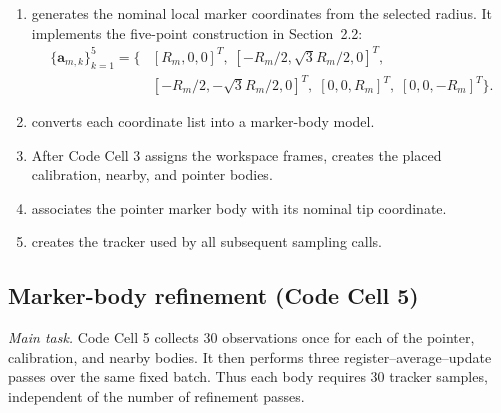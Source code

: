 \documentclass[11pt]{article}
\newcommand{\vct}[1]{\bm{#1}}
\begin{document}
\begin{enumerate}
\renewcommand{\labelenumi}{\roman{enumi}.}
\item {} generates the nominal local marker coordinates from the selected radius.  It implements the five-point construction in Section~2.2:
\[
\begin{aligned}
\{\vct{a}_{m,k}\}_{k=1}^{5}=\{&
[R_m,0,0]^T,\;
[-R_m/2,\sqrt{3}R_m/2,0]^T,\\
&[-R_m/2,-\sqrt{3}R_m/2,0]^T,\;
[0,0,R_m]^T,\;
[0,0,-R_m]^T\}.
\end{aligned}
\]
\item {} converts each coordinate list into a marker-body model.
\item After Code Cell 3 assigns the workspace frames,  creates the placed calibration, nearby, and pointer bodies.
\item {} associates the pointer marker body with its nominal tip coordinate.
\item {} creates the tracker used by all subsequent sampling calls.
\end{enumerate}

\subsection{Marker-body refinement (Code Cell 5)}
\noindent\textit{Main task.} Code Cell 5 collects 30 observations once for
each of the pointer, calibration, and nearby bodies.  It then performs three
register--average--update passes over the same fixed batch.  Thus each body
requires 30 tracker samples, independent of the number of refinement passes.
\end{document}
